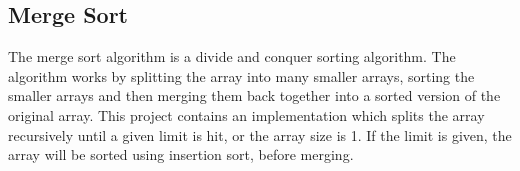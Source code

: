 \subsection{Merge Sort}
The merge sort algorithm is a divide and conquer sorting algorithm. The algorithm works by splitting the array into many smaller arrays, sorting the smaller arrays and then merging them back together into a sorted version of the original array. This project contains an implementation which splits the array recursively until a given limit is hit, or the array size is 1. If the limit is given, the array will be sorted using insertion sort, before merging.